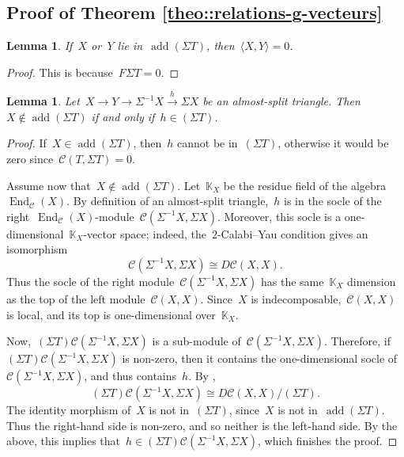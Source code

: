 \documentclass{amsart}
\newtheorem{lemma}[theorem]{Lemma}
\theoremstyle{definition}
\newcommand{\field}{\mathbb{K}}
\newcommand{\cat}{\mathcal{C}}
\newcommand{\susp}{\Sigma}
\newcommand{\add}{\operatorname{add}}
\newcommand{\End}[1]{\operatorname{End}_{#1}}
\begin{document}

\subsection{Proof of Theorem \ref{theo::relations-g-vecteurs}}

\begin{lemma}\label{lemm::bilinear-form-suspention-T}
 If~$X$ or~$Y$ lie in~$\add(\susp T)$, then~$\langle X, Y \rangle = 0$.
\end{lemma}
\begin{proof}
 This is because~$F\susp T = 0$.
\end{proof}

\begin{lemma}\label{lemm::almost-split}
 Let~$X\xrightarrow{} Y \xrightarrow{} \susp^{-1} X \xrightarrow{h} \susp X$ be an almost-split triangle.  Then~$X\notin \add(\susp T)$ if and only if~$h\in (\susp T)$.
\end{lemma}
\begin{proof}
 If~$X\in \add(\susp T)$, then~$h$ cannot be in~$(\susp T)$, otherwise it would be zero since~$\cat(T, \susp T) =0$.  
 
 Assume now that~$X\notin \add(\susp T)$.  Let~$\field_X$ be the residue field of the algebra~$\End{\cat}(X)$. 
 By definition of an almost-split triangle,~$h$ is in the socle of the right~$\End{\cat}(X)$-module~$\cat(\susp^{-1} X, \susp X)$.  Moreover, this socle is a one-dimensional~$\field_X$-vector space; indeed, the~$2$-Calabi--Yau condition gives an isomorphism
 \[
  \cat(\susp^{-1} X, \susp X) \cong D\cat(X, X).
 \]
 Thus the socle of the right module~$\cat(\susp^{-1} X, \susp X)$ has the same~$\field_X$ dimension as the top of the left module~$\cat(X,X)$.  Since~$X$ is indecomposable,~$\cat(X,X)$ is local, and its top is one-dimensional over~$\field_X$.
 
 Now,~$(\susp T)\cat(\susp^{-1} X, \susp X)$ is a sub-module of~$\cat(\susp^{-1} X, \susp X)$.  Therefore, if~$(\susp T)\cat(\susp^{-1} X, \susp X)$ is non-zero, then it contains the one-dimensional socle of~$\cat(\susp^{-1} X, \susp X)$, and thus contains~$h$.   
 By \cite{Palu},
 \[
  (\susp T)\cat(\susp^{-1} X, \susp X) \cong D\cat(X, X)/(\susp T). 
 \]
The identity morphism of~$X$ is not in~$(\susp T)$, since~$X$ is not in~$\add(\susp T)$.  Thus the right-hand side is non-zero, and so neither is the left-hand side.  By the above, this implies that~$h\in (\susp T)\cat(\susp^{-1} X, \susp X)$, which finishes the proof.
\end{proof}
\end{document}
